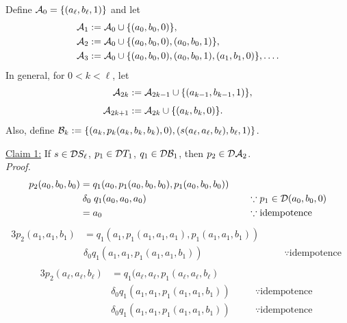   Define $\mathcal{A}_0 =\{(a_\ell, b_\ell, 1)\}$ and let
  \begin{align*}
    \mathcal{A}_1 &:=\mathcal{A}_0  \cup \{(a_0, b_0, 0) \},\\
    \mathcal{A}_2 &:=\mathcal{A}_0  \cup \{(a_0, b_0, 0), (a_0, b_0, 1)\},\\
    \mathcal{A}_3 &:= \mathcal{A}_0  \cup \{(a_0, b_0, 0), (a_0, b_0, 1), (a_1,b_1,0)\}, \dots.
  \end{align*}
    In general, for $0< k < \ell$, let
  \begin{align*}
    \mathcal{A}_{2k} &:= \mathcal{A}_{2k-1} \cup \{(a_{k-1},b_{k-1},1)\},\\[4pt]
    \mathcal{A}_{2k+1} &:= \mathcal{A}_{2k} \cup \{(a_{k},b_{k},0)\}.
  \end{align*}
  Also, define $\mathcal{B}_k := \{(a_k, p_k(a_k, b_k, b_k), 0), (s(a_{\ell}, a_{\ell}, b_{\ell}), b_{\ell}, 1)\}$.
  
  \medskip
  
  \noindent \underline{Claim 1:} 
  If 
  $s \in \mathcal{D} S_\ell$,  
  $p_1 \in \mathcal{D} T_1$, 
  $q_1\in \mathcal{D} \mathcal{B}_1$, then $p_2 \in \mathcal{D} \mathcal{A}_2$.\\[5pt]
  \emph{Proof.}
  \begin{alignat*}{3}
  p_2(a_0, b_0, b_0) &= q_1(a_0, p_1(a_0,b_0,b_0), p_1(a_0,b_0,b_0)) &  &\\
  &\mathrel{\delta_0} q_1(a_0, a_0, a_0) & \quad&\because p_1\in \mathcal{D} (a_0, b_0, 0)  \\
  &= a_0 & \quad&\because \text{idempotence }  
  \end{alignat*}
  \begin{alignat*}{3}
  p_2(a_1, a_1, b_1) &= q_1(a_1, p_1(a_1,a_1,a_1), p_1(a_1,a_1,b_1)) &  &\\
  &\mathrel{\delta_0} q_1(a_1, a_1, p_1(a_1, a_1, b_1)) & \quad&\because \text{idempotence }  \\
  \end{alignat*}
  \begin{alignat*}{3}
  p_2(a_\ell, a_\ell, b_\ell) &= q_1(a_\ell, a_\ell, p_1(a_\ell,a_\ell,b_\ell) &  &\\
  &\mathrel{\delta_0} q_1(a_1, a_1, p_1(a_1, a_1, b_1)) & \quad&\because \text{idempotence }  \\
  &\mathrel{\delta_0} q_1(a_1, a_1, p_1(a_1, a_1, b_1)) & \quad&\because \text{idempotence }  \\
  \end{alignat*}
  
